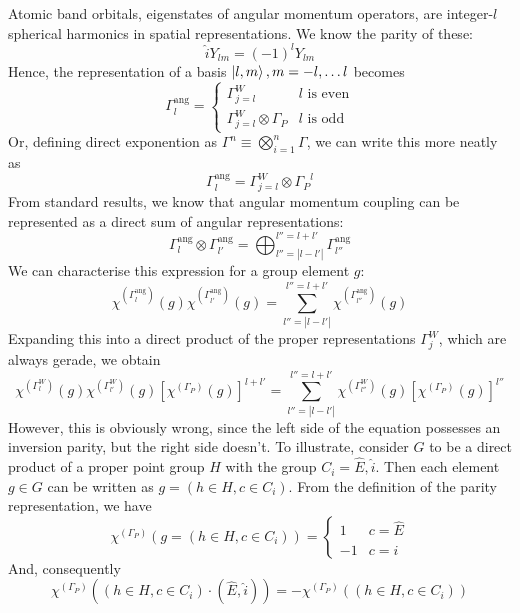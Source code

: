 \documentclass[12pt]{article}
\begin{document}
	Atomic band orbitals, eigenstates of angular momentum operators, are integer-$l$ spherical harmonics in spatial representations. We know the parity of these:
	$$\hat{i}Y_{lm}=(-1)^l Y_{lm}$$
	Hence, the representation of a basis $\ket{l,m}, m=-l,\dots l$ becomes
	$$\Gamma^\text{ang}_l=\begin{cases}
	\Gamma^W_{j=l} & l\text{ is even}\\
	\Gamma^W_{j=l}\otimes\Gamma_P & l\text{ is odd}
	\end{cases}$$
	Or, defining direct exponention as $\Gamma^n\equiv \bigotimes_{i=1}^{n} \Gamma$, we can write this more neatly as
	$$\Gamma^\text{ang}_l = \Gamma^W_{j=l}\otimes{\Gamma_P}^l$$
	From standard results, we know that angular momentum coupling can be represented as a direct sum of angular representations:
	$$\Gamma^\text{ang}_{l}\otimes \Gamma^\text{ang}_{l'} = \bigoplus_{l''=|l-l'|}^{l''=l+l'} \Gamma^\text{ang}_{l''}$$
	We can characterise this expression for a group element $g$:
	$$\chi^{\left(\Gamma^\text{ang}_{l}\right)}(g)\chi^{\left(\Gamma^\text{ang}_{l'}\right)}(g) = \sum_{l''=|l-l'|}^{l''=l+l'} \chi^{\left(\Gamma^\text{ang}_{l''}\right)}(g)$$
	Expanding this into a direct product of the proper representations $\Gamma^W_j$, which are always gerade, we obtain
	$$\chi^{\left(\Gamma^W_{l}\right)}(g)\chi^{\left(\Gamma^W_{l'}\right)}(g)\left[\chi^{\left(\Gamma_P\right)}(g)\right]^{l+l'} = \sum_{l''=|l-l'|}^{l''=l+l'} \chi^{\left(\Gamma^W_{l''}\right)}(g)\left[\chi^{\left(\Gamma_P\right)}(g)\right]^{l''}$$
	However, this is obviously wrong, since the left side of the equation possesses an inversion parity, but the right side doesn't. To illustrate, consider $G$ to be a direct product of a proper point group $H$ with the group $C_i={\hat{E}, \hat{i}}$. Then each element $g\in G$ can be written as $g=(h\in H, c\in C_i)$. From the definition of the parity representation, we have
	$$\chi^{\left(\Gamma_P\right)}(g=(h\in H, c\in C_i))=\begin{cases}
	1 & c=\hat{E}\\
	-1 & c=\hat{i}
	\end{cases}$$
	And, consequently
	$$\chi^{\left(\Gamma_P\right)}((h\in H, c\in C_i)\cdot (\hat{E}, \hat{i})) = -\chi^{\left(\Gamma_P\right)}((h\in H, c\in C_i))$$
	
\end{document}
